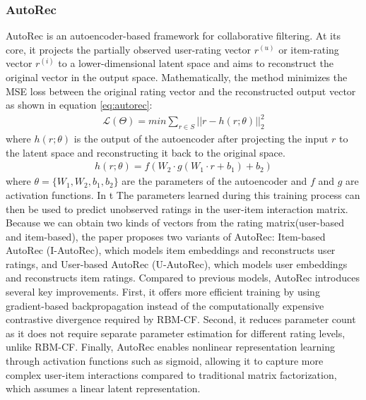 \documentclass{ieeetj}
\begin{document}
\subsubsection{AutoRec\cite{sedhain2015autorec}}
AutoRec is an autoencoder-based framework for collaborative filtering. At its core, it projects the partially observed user-rating vector $r^{(u)}$ or item-rating vector $r^{(i)}$ to a lower-dimensional latent space and aims to reconstruct the original vector in the output space. 
Mathematically, the method minimizes the MSE loss between the original rating vector and the reconstructed output vector as shown in equation \ref{eq:autorec}:
\begin{equation}
\label{eq:autorec}
\begin{aligned}
	\mathcal{L}(\Theta) = min \sum_{r \in S} ||r - h(r; \theta)||_2^2
\end{aligned}
\end{equation}
where $h(r;\theta)$ is the output of the autoencoder after projecting the input $r$ to the latent space and reconstructing it back to the original space. 
\begin{equation}
\label{eq:h function}
\begin{aligned}
	h(r; \theta) = f(W_2 \cdot g(W_1 \cdot r + b_1) + b_2)
\end{aligned}
\end{equation}
where $\theta = \{W_1, W_2, b_1, b_2\}$ are the parameters of the autoencoder and $f$ and $g$ are activation functions. In t
The parameters learned during this training process can then be used to predict unobserved ratings in the user-item interaction matrix. Because we can obtain two kinds of vectors from the rating matrix(user-based and item-based), the paper proposes two variants of AutoRec: Item-based AutoRec (I-AutoRec), which models item embeddings and reconstructs user ratings, and User-based AutoRec (U-AutoRec), which models user embeddings and reconstructs item ratings. Compared to previous models, AutoRec introduces several key improvements. First, it offers more efficient training by using gradient-based backpropagation instead of the computationally expensive contrastive divergence required by RBM-CF. Second, it reduces parameter count as it does not require separate parameter estimation for different rating levels, unlike RBM-CF. Finally, AutoRec enables nonlinear representation learning through activation functions such as sigmoid, allowing it to capture more complex user-item interactions compared to traditional matrix factorization, which assumes a linear latent representation.
\end{document}
